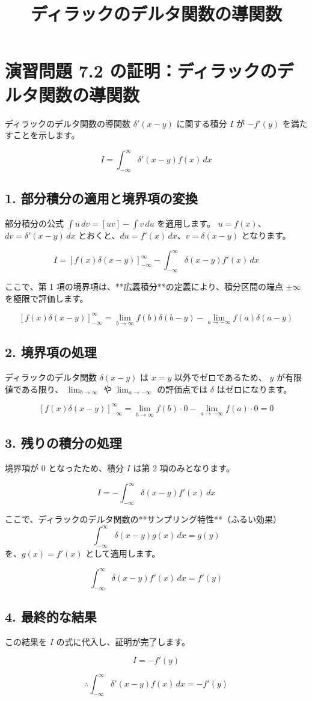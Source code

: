 \documentclass{ltjsarticle}
\begin{document}
\title{ディラックのデルタ関数の導関数}

\section*{演習問題 7.2 の証明：ディラックのデルタ関数の導関数}

ディラックのデルタ関数の導関数 $\delta'(x-y)$ に関する積分 $I$ が $-f'(y)$ を満たすことを示します。

$$I = \int_{-\infty}^{\infty} \delta'(x-y) f(x) \, dx$$

\subsection*{1. 部分積分の適用と境界項の変換}

部分積分の公式 $\int u \, dv = [uv] - \int v \, du$ を適用します。
$u = f(x)$、 $dv = \delta'(x-y) \, dx$ とおくと、$du = f'(x) \, dx$、$v = \delta(x-y)$ となります。

$$I = \left[ f(x) \delta(x-y) \right]_{-\infty}^{\infty} - \int_{-\infty}^{\infty} \delta(x-y) f'(x) \, dx$$

ここで、第 1 項の境界項は、**広義積分**の定義により、積分区間の端点 $\pm\infty$ を極限で評価します。

$$\left[ f(x)\delta(x-y) \right]_{-\infty}^{\infty} = \lim_{b\to\infty} f(b)\delta(b-y) - \lim_{a\to-\infty} f(a)\delta(a-y)$$

\subsection*{2. 境界項の処理}

ディラックのデルタ関数 $\delta(x-y)$ は $x=y$ 以外でゼロであるため、 $y$ が有限値である限り、 $\lim_{b\to\infty}$ や $\lim_{a\to-\infty}$ の評価点では $\delta$ はゼロになります。

$$\left[ f(x)\delta(x-y) \right]_{-\infty}^{\infty} = \lim_{b\to\infty} f(b) \cdot 0 - \lim_{a\to-\infty} f(a) \cdot 0 = 0$$

\subsection*{3. 残りの積分の処理}

境界項が $0$ となったため、積分 $I$ は第 2 項のみとなります。

$$I = - \int_{-\infty}^{\infty} \delta(x-y) f'(x) \, dx$$

ここで、ディラックのデルタ関数の**サンプリング特性**（ふるい効果）
$$\int_{-\infty}^{\infty} \delta(x-y) g(x) \, dx = g(y)$$
を、$g(x) = f'(x)$ として適用します。

$$\int_{-\infty}^{\infty} \delta(x-y) f'(x) \, dx = f'(y)$$

\subsection*{4. 最終的な結果}

この結果を $I$ の式に代入し、証明が完了します。

$$I = - f'(y)$$

$$\therefore \int_{-\infty}^{\infty} \delta'(x-y) f(x) \, dx = -f'(y)$$
\end{document}

